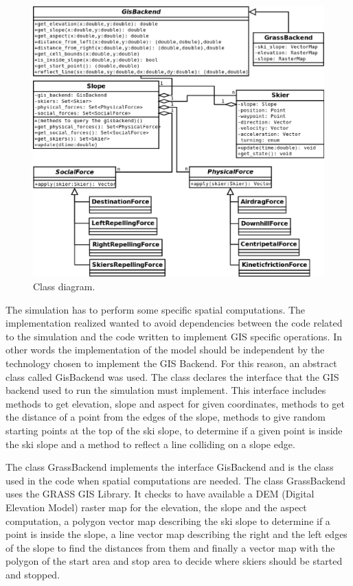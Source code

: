 \documentclass[12pt,a4paper,twoside]{book}
\begin{document}
\begin{figure}[!h]
  \begin{center}
    \includegraphics[width=\textwidth]{images/Class_diagram.eps}
    \caption{Class diagram.}\label{class_diagram}
  \end{center}
\end{figure}

The simulation has to perform some specific spatial computations. The implementation realized wanted to avoid dependencies between the code related to the simulation and the code written to implement GIS specific operations. In other words the implementation of the model should be independent by the technology chosen to implement the GIS Backend. For this reason, an abstract class called GisBackend was used. The class declares the interface that the GIS backend used to run the simulation must implement. This interface includes methods to get elevation, slope and aspect for given coordinates, methods to get the distance of a point from the edges of the slope, methods to give random starting points at the top of the ski slope, to determine if a given point is inside the ski slope and a method to reflect a line colliding on a slope edge.

The class GrassBackend implements the interface GisBackend and is the class used in the code when spatial computations are needed. The class GrassBackend uses the GRASS GIS Library. It checks to have available a DEM (Digital Elevation Model) raster map for the elevation, the slope and the aspect computation, a polygon vector map describing the ski slope to determine if a point is inside the slope, a line vector map describing the right and the left edges of the slope to find the distances from them and finally a vector map with the polygon of the start area and stop area to decide where skiers should be started and stopped.
\end{document}
